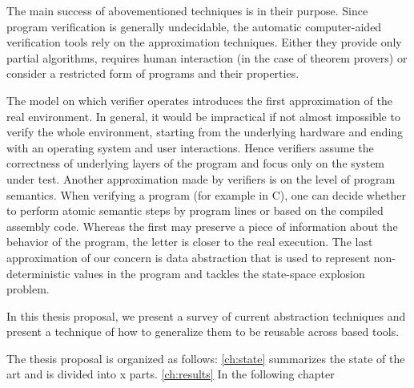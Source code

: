 The main success of abovementioned techniques is in their purpose.
Since program verification is generally undecidable, the automatic computer-aided verification tools rely on the approximation techniques.
Either they provide only partial algorithms, requires human interaction (in the case of theorem provers) or consider a restricted form of programs and their properties.

The model on which verifier operates introduces the first approximation of the real environment.
In general, it would be impractical if not almost impossible to verify the whole environment, starting from the underlying hardware and ending with an operating system and user interactions.
Hence verifiers assume the correctness of underlying layers of the program and focus only on the system under test.
Another approximation made by verifiers is on the level of program semantics.  When verifying a program (for example in C), one can decide whether to perform atomic semantic steps by program lines or based on the compiled assembly code. Whereas the first may preserve a piece of information about the behavior of the program, the letter is closer to the real execution.
The last approximation of our concern is data abstraction that is used to represent non-deterministic values in the program and tackles the state-space explosion problem.

In this thesis proposal, we present a survey of current abstraction techniques and present a technique of how to generalize them to be reusable across \llvm based tools.




The thesis proposal is organized as follows: \autoref{ch:state} summarizes the state of the art and is divided into {\color{red}x} parts. \autoref{ch:results}
In the following chapter


